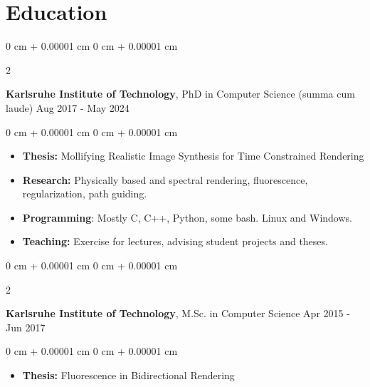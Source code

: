 \documentclass[10pt, letterpaper]{article}
\newenvironment{highlights}{
    \begin{itemize}[
        topsep=0.10 cm,
        parsep=0.10 cm,
        partopsep=0pt,
        itemsep=0pt,
        leftmargin=0 cm + 10pt
    ]
}{
    \end{itemize}
} %
\newenvironment{onecolentry}{
    \begin{adjustwidth}{
        0 cm + 0.00001 cm
    }{
        0 cm + 0.00001 cm
    }
}{
    \end{adjustwidth}
} %
\newenvironment{twocolentry}[2][]{
    \onecolentry
    \def\secondColumn{#2}
    \setcolumnwidth{\fill, 4.5 cm}
    \begin{paracol}{2}
}{
    \switchcolumn \raggedleft \secondColumn
    \end{paracol}
    \endonecolentry
} %
\begin{document}
\vspace{.5cm}
    \section{Education} 

    \newcommand{\expspace}{\vspace{.25cm}}
\newcommand{\educspace}{\expspace} 
\newcommand{\sectspacetop}{\vspace{.1cm}}
\sectspacetop
        \begin{twocolentry}{
            Aug 2017 - May 2024
        }
            \textbf{Karlsruhe Institute of Technology}, PhD in Computer Science (summa cum laude)\end{twocolentry}

        \vspace{0.10 cm}
        \begin{onecolentry}
            \begin{highlights}
            \item \textbf{Thesis:} Mollifying Realistic Image Synthesis for Time Constrained Rendering
                \item \textbf{Research:} Physically based and spectral rendering, fluorescence, regularization, path guiding.
                \item \textbf{Programming}: Mostly C, C++, Python, some bash. Linux and Windows.
                \item \textbf{Teaching:} Exercise for lectures, advising student projects and theses.
            \end{highlights}
        \end{onecolentry}

        \educspace

        \begin{twocolentry}{
            Apr 2015 - Jun 2017
        }
            \textbf{Karlsruhe Institute of Technology}, M.Sc. in Computer Science\end{twocolentry}

        \vspace{0.10 cm}
        \begin{onecolentry}
            \begin{highlights}
            \item \textbf{Thesis:} Fluorescence in Bidirectional Rendering
            \end{highlights}
        \end{onecolentry}
\end{document}
